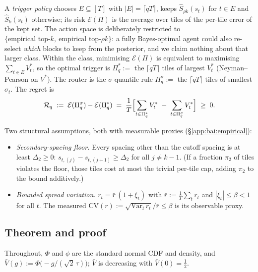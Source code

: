 \documentclass[11pt]{article}
\theoremstyle{remark}
\begin{document}
A \emph{trigger policy} chooses $E \subseteq [T]$ with $|E| = \lceil qT \rceil$, keeps $\widehat S_{\rho k}(s_t)$ for $t \in E$ and $\widehat S_k(s_t)$ otherwise; its risk $\mathcal E(\Pi)$ is the average over tiles of the per-tile error of the kept set. The action space is deliberately restricted to $\{\text{empirical top-}k,\ \text{empirical top-}\rho k\}$: a fully Bayes-optimal agent could also re-select \emph{which} blocks to keep from the posterior, and we claim nothing about that larger class. Within the class, minimising $\mathcal E(\Pi)$ is equivalent to maximising $\sum_{t \in E} V^*_t$, so the optimal trigger is $\Pi_q^* :=$ the $\lceil qT \rceil$ tiles of largest $V^*_t$ (Neyman--Pearson on $V^*$). The router is the $\sigma$-quantile rule $\Pi_q^\sigma :=$ the $\lceil qT \rceil$ tiles of smallest $\sigma_t$. The regret is
\begin{equation}\label{eq:regret-def}
\mathcal R_q \;:=\; \mathcal E(\Pi_q^\sigma) - \mathcal E(\Pi_q^*) \;=\; \frac1T \Bigl[ \sum_{t \in \Pi_q^*} V^*_t \;-\; \sum_{t \in \Pi_q^\sigma} V^*_t \Bigr] \;\ge\; 0.
\end{equation}

Two structural assumptions, both with measurable proxies (\S\ref{app:bai:empirical}):
\begin{itemize}[leftmargin=*,topsep=0.2em,itemsep=0.1em]
    \item[\textbf{(A1)}] \emph{Secondary-spacing floor.} Every spacing other than the cutoff spacing is at least $\Delta_2 \ge 0$: $s_{t,(j)} - s_{t,(j+1)} \ge \Delta_2$ for all $j \ne k-1$. (If a fraction $\pi_2$ of tiles violates the floor, those tiles cost at most the trivial per-tile cap, adding $\pi_2$ to the bound additively.)
    \item[\textbf{(A2)}] \emph{Bounded spread variation.} $r_t = \bar r\,(1 + \xi_t)$ with $\bar r := \frac1T\sum_t r_t$ and $|\xi_t| \le \beta < 1$ for all $t$. The measured $\mathrm{CV}(r) := \sqrt{\mathrm{Var}_t\, r_t}/\bar r \le \beta$ is its observable proxy.
\end{itemize}

\subsection{Theorem and proof}\label{app:bai:theorem}

Throughout, $\Phi$ and $\phi$ are the standard normal CDF and density, and $\bar V(g) := \Phi\bigl(-g/(\sqrt2\,\tau)\bigr)$; $\bar V$ is decreasing with $\bar V(0) = \tfrac12$.
\end{document}
